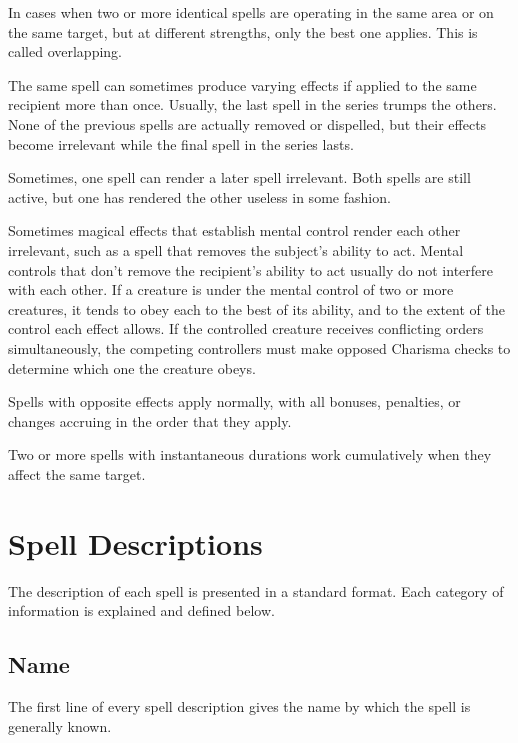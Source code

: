  In cases when two or more identical spells are operating in the same area or on the same target, but at different strengths, only the best one applies. This is called overlapping.

 The same spell can sometimes produce varying effects if applied to the same recipient more than once. Usually, the last spell in the series trumps the others. None of the previous spells are actually removed or dispelled, but their effects become irrelevant while the final spell in the series lasts.

 Sometimes, one spell can render a later spell irrelevant. Both spells are still active, but one has rendered the other useless in some fashion.

 Sometimes magical effects that establish mental control render each other irrelevant, such as a spell that removes the subject's ability to act. Mental controls that don't remove the recipient's ability to act usually do not interfere with each other. If a creature is under the mental control of two or more creatures, it tends to obey each to the best of its ability, and to the extent of the control each effect allows. If the controlled creature receives conflicting orders simultaneously, the competing controllers must make opposed Charisma checks to determine which one the creature obeys.

 Spells with opposite effects apply normally, with all bonuses, penalties, or changes accruing in the order that they apply.

 Two or more spells with instantaneous durations work cumulatively when they affect the same target.

\section{Spell Descriptions}
The description of each spell is presented in a standard format. Each category of information is explained and defined below.

\subsection{Name}
The first line of every spell description gives the name by which the spell is generally known.

